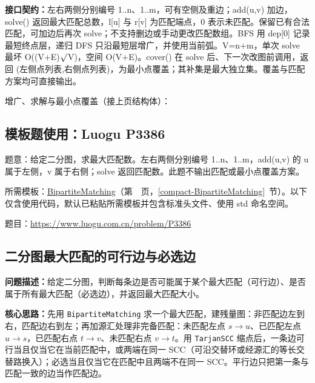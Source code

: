 {\sloppy{}\noindent\textbf{接口契约：}左右两侧分别编号 1..n、1..m，可有空侧及重边；add(u,v) 加边，solve() 返回最大匹配总数，l[u] 与 r[v] 为匹配端点，0 表示未匹配。保留已有合法匹配，可加边后再次 solve；不支持删边或手动更改匹配数组。BFS 用 dep[0] 记录最短终点层，递归 DFS 只沿最短层增广，并使用当前弧。V=n+m，单次 solve 最坏 O((V+E)$\sqrt{\vphantom x}$V)，空间 O(V+E)。cover() 在 solve 后、下一次改图前调用，返回 (左侧点列表,右侧点列表)，为最小点覆盖；其补集是最大独立集。覆盖与匹配方案均可直接输出。\par}



\newpage\noindent 增广、求解与最小点覆盖（接上页结构体）：



\Needspace{333pt}

\subsection*{模板题使用：Luogu P3386}

\label{usage-example-35}

题意：给定二分图，求最大匹配数。左右两侧分别编号 1..n、1..m，add(u,v) 的 u 属于左侧，v 属于右侧；solve 返回匹配数。此题不输出匹配或最小点覆盖方案。

所需模板：\hyperref[compact-BipartiteMatching]{BipartiteMatching}（第~\pageref{compact-BipartiteMatching}~页，\ref{compact-BipartiteMatching}~节）。以下仅含使用代码，默认已粘贴所需模板并包含标准头文件、使用 std 命名空间。

题目：\url{https://www.luogu.com.cn/problem/P3386}



\subsection{二分图最大匹配的可行边与必选边}\label{compact-matching_edges}

\noindent\textbf{问题描述：}\allowbreak 给定二分图，判断每条边是否可能属于某个最大匹配（可行边）、是否属于所有最大匹配（必选边），并返回最大匹配大小。

\textbf{核心思路：}\allowbreak 先用 \texttt{BipartiteMatching} 求一个最大匹配，建残量图：非匹配边左到右，匹配边右到左；再加源汇处理非完备匹配：未匹配左点 $s\to u$、已匹配左点 $u\to s$，已匹配右点 $t\to v$、未匹配右点 $v\to t$。用 \texttt{TarjanSCC} 缩点后，一条边可行当且仅当它在当前匹配中，或两端在同一 SCC（可沿交替环或经源汇的等长交替路换入）；必选当且仅当它在匹配中且两端不在同一 SCC。平行边只把第一条与匹配一致的边当作匹配边。

